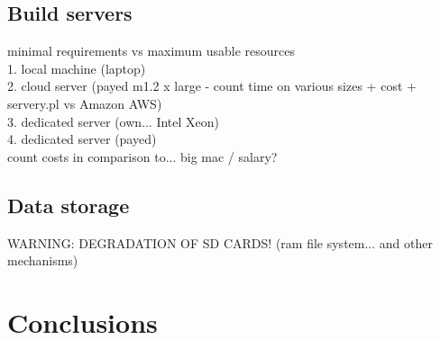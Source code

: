 \documentclass[printmode]{mgr}
\begin{document}
\section{Build servers}
minimal requirements vs maximum usable resources\\
1. local machine (laptop)\\
2. cloud server (payed m1.2 x large - count time on various sizes + cost + servery.pl vs Amazon AWS)\\
3. dedicated server (own... Intel Xeon)\\
4. dedicated server (payed)\\
count costs in comparison to... big mac / salary?



\section{Data storage}
WARNING: DEGRADATION OF SD CARDS! (ram file system... and other mechanisms)

\chapter{Conclusions}
\label{chapter:conclusions}



\listoffigures
\listoftables
\end{document}
